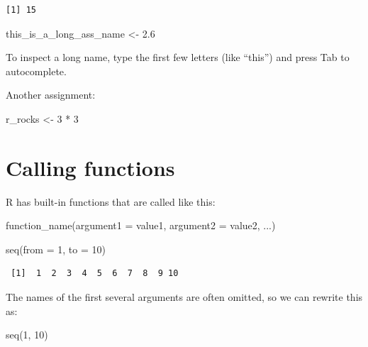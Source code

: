 \documentclass[
  letterpaper,
  DIV=11,
  numbers=noendperiod]{scrreprt}
\newenvironment{Shaded}{\begin{snugshade}}{\end{snugshade}}
\newcommand{\AttributeTok}[1]{\textcolor[rgb]{0.40,0.45,0.13}{#1}}
\newcommand{\DecValTok}[1]{\textcolor[rgb]{0.68,0.00,0.00}{#1}}
\newcommand{\FloatTok}[1]{\textcolor[rgb]{0.68,0.00,0.00}{#1}}
\newcommand{\FunctionTok}[1]{\textcolor[rgb]{0.28,0.35,0.67}{#1}}
\newcommand{\NormalTok}[1]{\textcolor[rgb]{0.00,0.23,0.31}{#1}}
\newcommand{\OtherTok}[1]{\textcolor[rgb]{0.00,0.23,0.31}{#1}}
\newcommand{\SpecialCharTok}[1]{\textcolor[rgb]{0.37,0.37,0.37}{#1}}
\begin{document}
\begin{verbatim}
[1] 15
\end{verbatim}

\begin{Shaded}
\begin{Highlighting}[]
\NormalTok{this\_is\_a\_long\_ass\_name }\OtherTok{\textless{}{-}} \FloatTok{2.6}
\end{Highlighting}
\end{Shaded}

To inspect a long name, type the first few letters (like ``this'') and
press Tab to autocomplete.

Another assignment:

\begin{Shaded}
\begin{Highlighting}[]
\NormalTok{r\_rocks }\OtherTok{\textless{}{-}} \DecValTok{3} \SpecialCharTok{*} \DecValTok{3}
\end{Highlighting}
\end{Shaded}

\section{Calling functions}\label{calling-functions}

R has built-in functions that are called like this:

\begin{Shaded}
\begin{Highlighting}[]
\FunctionTok{function\_name}\NormalTok{(}\AttributeTok{argument1 =}\NormalTok{ value1, }\AttributeTok{argument2 =}\NormalTok{ value2, ...)}
\end{Highlighting}
\end{Shaded}

\begin{Shaded}
\begin{Highlighting}[]
\FunctionTok{seq}\NormalTok{(}\AttributeTok{from =} \DecValTok{1}\NormalTok{, }\AttributeTok{to =} \DecValTok{10}\NormalTok{)}
\end{Highlighting}
\end{Shaded}

\begin{verbatim}
 [1]  1  2  3  4  5  6  7  8  9 10
\end{verbatim}

The names of the first several arguments are often omitted, so we can
rewrite this as:

\begin{Shaded}
\begin{Highlighting}[]
\FunctionTok{seq}\NormalTok{(}\DecValTok{1}\NormalTok{, }\DecValTok{10}\NormalTok{)}
\end{Highlighting}
\end{Shaded}
\end{document}
